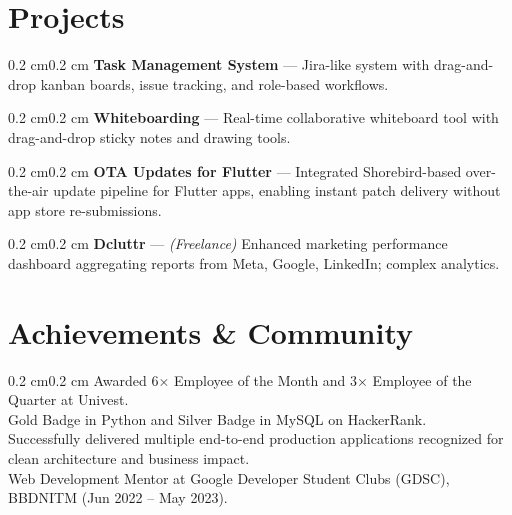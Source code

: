 \documentclass[10pt, letterpaper]{article}
\newenvironment{onecolentry}{\begin{adjustwidth}{0.2 cm}{0.2 cm}\linespread{1.2}\selectfont}{\end{adjustwidth}}
\let\hrefWithoutArrow\href
\renewcommand{\href}[2]{\hrefWithoutArrow{#1}{\ifthenelse{\equal{#2}{}}{ }{#2 }\raisebox{.15ex}{\footnotesize \faExternalLink*}}}
\begin{document}
\section{Projects}
\begin{onecolentry}
\textbf{Task Management System} — \href{https://jira.cvasingh.com}{}
Jira-like system with drag-and-drop kanban boards, issue tracking, and role-based workflows.
\end{onecolentry}
\begin{onecolentry}
\textbf{Whiteboarding} — \href{https://white-board.cvasingh.com}{}
Real-time collaborative whiteboard tool with drag-and-drop sticky notes and drawing tools.
\end{onecolentry}
\begin{onecolentry}
\textbf{OTA Updates for Flutter} — \href{https://shorebird.dev}{}
Integrated Shorebird-based over-the-air update pipeline for Flutter apps, enabling instant patch delivery without app store re-submissions.
\end{onecolentry}
\begin{onecolentry}
\textbf{Dcluttr} — \href{https://app.dcluttr.ai}{} \textit{(Freelance)}
Enhanced marketing performance dashboard aggregating reports from Meta, Google, LinkedIn; complex analytics.
\end{onecolentry}

\section{Achievements \& Community}
\begin{onecolentry}
Awarded 6× Employee of the Month and 3× Employee of the Quarter at Univest.\\
Gold Badge in Python and Silver Badge in MySQL on HackerRank.\\
Successfully delivered multiple end-to-end production applications recognized for clean architecture and business impact.\\
Web Development Mentor at Google Developer Student Clubs (GDSC), BBDNITM (Jun 2022 – May 2023).
\end{onecolentry}
\end{document}
